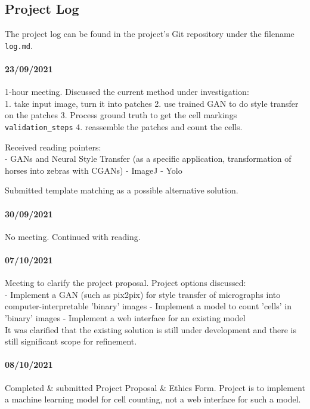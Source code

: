 \begin{appendices}
\section{Project Log}
The project log can be found in the project's Git repository under the filename \verb`log.md`.\\

\paragraph{23/09/2021}
1-hour meeting. Discussed the current method under investigation:\\
1. take input image, turn it into patches
2. use trained GAN to do style transfer on the patches
3. Process ground truth to get the cell markings \verb`validation_steps`
4. reassemble the patches and count the cells.

Received reading pointers:\\
   - GANs and Neural Style Transfer (as a specific application, transformation of horses into zebras with CGANs)
   - ImageJ
   - Yolo

Submitted template matching as a possible alternative solution.

\paragraph{30/09/2021}
No meeting. Continued with reading.

\paragraph{07/10/2021}
Meeting to clarify the project proposal. Project options discussed:\\
- Implement a GAN (such as pix2pix) for style transfer of micrographs into computer-interpretable 'binary' images
- Implement a model to count 'cells' in 'binary' images
- Implement a web interface for an existing model\\

It was clarified that the existing solution is still under development and there is still significant scope for refinement.

\paragraph{08/10/2021}
Completed & submitted Project Proposal & Ethics Form. Project is to implement a machine learning model for cell counting, not a web interface for such a model.\\


\end{appendices}
